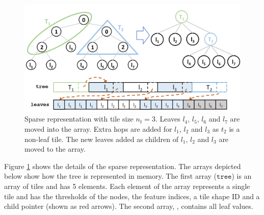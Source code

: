 \begin{figure}
  \centering
  \includegraphics[width=\linewidth]{figures/SparseRep_TileSize3.PNG}
  \caption{Sparse representation with tile size $n_t=3$. Leaves $l_4$, $l_5$, $l_6$ and $l_7$ are moved into the  array.
  Extra hops are added for $l_1$, $l_2$ and $l_3$ as $t_2$ is a non-leaf tile. The new leaves added as children of $l_1$, $l_2$ and $l_3$
  are moved to the  array.}
  \label{Fig:SparseRep}
\end{figure}

Figure \ref{Fig:SparseRep} shows the details of the sparse representation.
The arrays depicted below show how the tree is represented in memory. The first array ($\texttt{tree}$) is an array of tiles 
and has 5 elements. Each element of the array represents a single tile and has the thresholds of the nodes, the feature
indices, a tile shape ID and a child pointer (shown as red arrows). The second array, , contains
all leaf values. 



